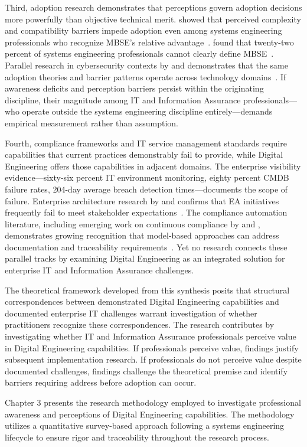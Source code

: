 Third, adoption research demonstrates that perceptions govern adoption decisions more powerfully than objective technical merit. \citeauthor{Call_2024} showed that perceived complexity and compatibility barriers impede adoption even among systems engineering professionals who recognize MBSE's relative advantage~\parencite{Call_2024}. \citeauthor{Henderson_McDermott_Salado_2024} found that twenty-two percent of systems engineering professionals cannot clearly define MBSE~\parencite{Henderson_McDermott_Salado_2024}. Parallel research in cybersecurity contexts by \citeauthor{Hasani_2023} and \citeauthor{Anthony_2024} demonstrates that the same adoption theories and barrier patterns operate across technology domains~\parencite{Hasani_2023, Anthony_2024}. If awareness deficits and perception barriers persist within the originating discipline, their magnitude among IT and Information Assurance professionals---who operate outside the systems engineering discipline entirely---demands empirical measurement rather than assumption.

Fourth, compliance frameworks and IT service management standards require capabilities that current practices demonstrably fail to provide, while Digital Engineering offers those capabilities in adjacent domains. The enterprise visibility evidence---sixty-six percent IT environment monitoring, eighty percent CMDB failure rates, 204-day average breach detection times---documents the scope of failure. Enterprise architecture research by \citeauthor{Tamm_2022} and \citeauthor{van_de_Wetering_2022} confirms that EA initiatives frequently fail to meet stakeholder expectations~\parencite{Tamm_2022, van_de_Wetering_2022}. The compliance automation literature, including emerging work on continuous compliance by \citeauthor{Santilli_2023} and \citeauthor{Angermeir_2024}, demonstrates growing recognition that model-based approaches can address documentation and traceability requirements~\parencite{Santilli_2023, Angermeir_2024}. Yet no research connects these parallel tracks by examining Digital Engineering as an integrated solution for enterprise IT and Information Assurance challenges.

The theoretical framework developed from this synthesis posits that structural correspondences between demonstrated Digital Engineering capabilities and documented enterprise IT challenges warrant investigation of whether practitioners recognize these correspondences. The research contributes by investigating whether IT and Information Assurance professionals perceive value in Digital Engineering capabilities. If professionals perceive value, findings justify subsequent implementation research. If professionals do not perceive value despite documented challenges, findings challenge the theoretical premise and identify barriers requiring address before adoption can occur.

Chapter 3 presents the research methodology employed to investigate professional awareness and perceptions of Digital Engineering capabilities. The methodology utilizes a quantitative survey-based approach following a systems engineering lifecycle to ensure rigor and traceability throughout the research process.